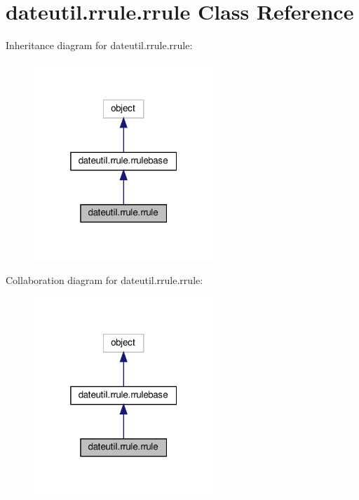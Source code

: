 \hypertarget{classdateutil_1_1rrule_1_1rrule}{}\section{dateutil.\+rrule.\+rrule Class Reference}
\label{classdateutil_1_1rrule_1_1rrule}


Inheritance diagram for dateutil.\+rrule.\+rrule\+:
\nopagebreak
\begin{figure}[H]
\begin{center}
\leavevmode
\includegraphics[width=193pt]{classdateutil_1_1rrule_1_1rrule__inherit__graph}
\end{center}
\end{figure}


Collaboration diagram for dateutil.\+rrule.\+rrule\+:
\nopagebreak
\begin{figure}[H]
\begin{center}
\leavevmode
\includegraphics[width=193pt]{classdateutil_1_1rrule_1_1rrule__coll__graph}
\end{center}
\end{figure}
